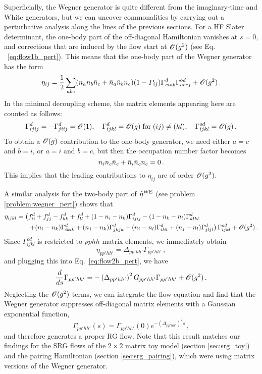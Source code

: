 Superficially, the Wegner generator is quite different from the imaginary-time 
and White generators, but we can uncover commonalities by carrying out a 
perturbative analysis along the lines of the previous sections. For a HF 
Slater determinant, the one-body part of the off-diagonal Hamiltonian vanishes 
at $s=0$, and corrections that are induced by the flow start at $\mathcal{O}(g^2)$
(see Eq. ~\eqref{eq:flow1b_pert}). This means that the one-body part of
the Wegner generator has the form
\begin{equation}
  \eta_{ij} = \frac{1}{2} 
      \sum_{abc}(n_an_b\bar{n}_c+\bar{n}_a\bar{n}_bn_c) (1-P_{ij})\Gamma^d_{ciab}\Gamma^{od}_{abcj}
      + \mathcal{O}(g^2)\,.
\end{equation}
In the minimal decoupling scheme, the matrix elements appearing here are
counted as follows:
\begin{equation}
  \Gamma^d_{ijij} = -\Gamma^d_{jiij} = \mathcal{O}(1), \quad \Gamma^d_{ijkl} = \mathcal{O}(g)\; \text{for}\; (ij)\neq(kl), 
  \quad \Gamma^{od}_{ijkl} = \mathcal{O}(g)\,.
\end{equation}
To obtain a $\mathcal{O}(g)$ contribution to the one-body generator, we need
either $a=c$ and $b=i$, or $a=i$ and $b=c$, but then the occupation number
factor becomes
\begin{equation}
  n_{i}n_{c}\bar{n}_c + \bar{n}_{i} \bar{n}_{c} n_c = 0\,.
\end{equation}
This implies that the leading contributions to $\eta_{ij}$ are of order $\mathcal{O}(g^2)$.

A similar analysis for the two-body part of $\hat{\eta}^\text{WE}$ (see problem
\ref{problem:wegner_pert}) shows that
\begin{align}
  \eta_{ijkl}
    &=\left(f^d_{ii} + f^d_{jj} - f^d_{kk} + f^d_{ll} + (1-n_i-n_k)\Gamma^d_{ijij} - (1-n_k-n_l)\Gamma^d_{klkl} 
    \right.\notag\\
    &\hphantom{=}\left.\quad
    + (n_i-n_k) \Gamma^d_{ikik} + (n_j-n_k) \Gamma^d_{jkjk} + (n_i-n_l) \Gamma^d_{ilil} + (n_j-n_l) \Gamma^d_{jljl}
  \right)\Gamma^{od}_{ijkl}
  +\OC(g^2)\,.
  \label{eq:wegner2b_pert}
\end{align}
Since $\Gamma^{od}_{ijkl}$ is restricted to $pphh$ matrix elements, we immediately
obtain
\begin{equation}
  \eta_{pp'hh'} = \Delta_{pp'hh'}\Gamma_{pp'hh'}\,,
\end{equation}
and plugging this into Eq.~\eqref{eq:flow2b_pert}, we have
\begin{equation}
     \frac{d {}} {d {s}} \Gamma_{pp'hh'} 
  =-\left(\Delta_{pp'hh'}\right)^2G_{pp'hh'}\Gamma_{pp'hh'} + \mathcal{O}(g^2)\,.
\end{equation}
Neglecting the $\mathcal{O}(g^2)$ terms, we can integrate the flow equation
and find that the Wegner generator suppresses off-diagonal matrix
elements with a Gaussian exponential function,
\begin{equation}
  \Gamma_{pp'hh'}(s) = \Gamma_{pp'hh'}(0) e^{-(\Delta_{pp'hh'})^2s}\,,
\end{equation}
and therefore generates a proper RG flow. Note that this result matches 
our findings for the SRG flows of the 
$2\times2$ matrix toy model (section \ref{sec:srg_toy}) and the pairing 
Hamiltonian (section \ref{sec:srg_pairing}), which were using matrix 
versions of the Wegner generator.

